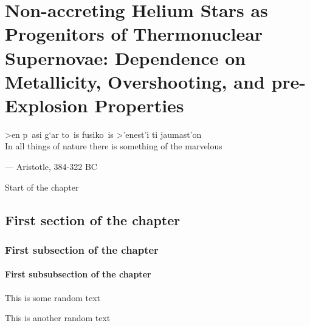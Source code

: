 \documentclass[main.tex]{subfiles}
\begin{document}
    \chapter[Helium Stars: small title]{Non-accreting Helium Stars as Progenitors of Thermonuclear Supernovae: Dependence on Metallicity, Overshooting, and pre-Explosion Properties}
    \setlength{\epigraphwidth}{0.8\textwidth}
    \epigraph{
            >en p~asi g`ar to~is fusiko~is >'enest'i ti jaumast'on\\
            \vspace{0.2cm}
            In all things of nature there is something of the marvelous
    }{--- Aristotle, 384-322 BC}
    
    {\hypersetup{linkcolor=black, pdfborder=0 0 1}
        \minitoc
        \newpage
    }
    
    \pstart Start of the chapter
    \lipsum
    
    \section{First section of the chapter}
    \lipsum
    
    \subsection{First subsection of the chapter}
    \lipsum
    
    \subsubsection{First subsubsection of the chapter}
    This is some random text
    \lipsum[1]
    
    This is another random text
\end{document}
